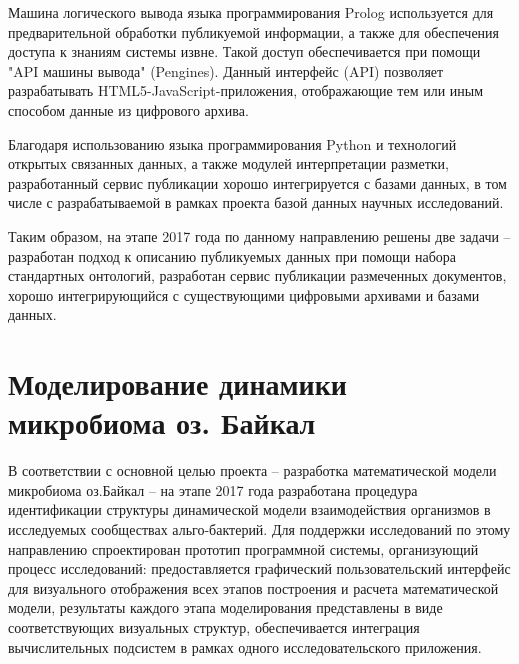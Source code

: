 \documentclass[a4paper,12pt,openany,final]{extreport}
\begin{document}
Машина логического вывода языка программирования Prolog используется для
предварительной обработки публикуемой информации, а также для
обеспечения доступа к знаниям системы извне. Такой доступ обеспечивается
при помощи "API машины вывода" (Pengines). Данный интерфейс (API)
позволяет разрабатывать HTML5-JavaScript-приложения, отображающие тем
или иным способом данные из цифрового архива.

Благодаря использованию языка программирования Python и технологий
открытых связанных данных, а также модулей интерпретации разметки,
разработанный сервис публикации хорошо интегрируется с базами данных, в
том числе с разрабатываемой в рамках проекта базой данных научных
исследований.

Таким образом, на этапе 2017 года по данному направлению решены две
задачи -- разработан подход к описанию публикуемых данных при помощи
набора стандартных онтологий, разработан сервис публикации размеченных
документов, хорошо интегрирующийся с существующими цифровыми архивами и
базами данных.

\chapter{Моделирование динамики микробиома оз. Байкал}\label{chap:9}

В соответствии с основной целью проекта -- разработка математической
модели микробиома оз.Байкал -- на этапе 2017 года разработана процедура
идентификации структуры динамической модели взаимодействия организмов в
исследуемых сообществах альго-бактерий. Для поддержки исследований по
этому направлению спроектирован прототип программной системы,
организующий процесс исследований: предоставляется графический
пользовательский интерфейс для визуального отображения всех этапов
построения и расчета математической модели, результаты каждого этапа
моделирования представлены в виде соответствующих визуальных структур,
обеспечивается интеграция вычислительных подсистем в рамках одного
исследовательского приложения.
\end{document}
